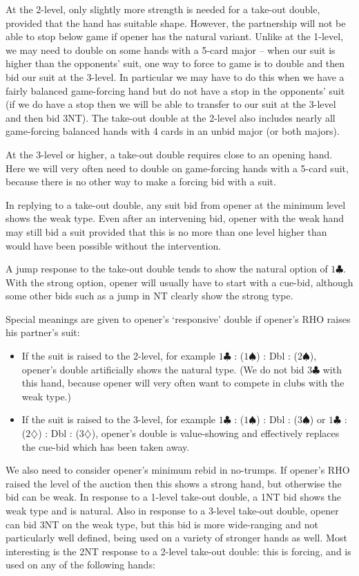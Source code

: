 \documentclass{article}
\newcommand{\sz}{\spadesuit}
\newcommand{\dz}{\diamondsuit}
\newcommand{\cz}{\clubsuit}
\begin{document}
At the 2-level, only slightly more strength is needed for a take-out double, provided that the hand has suitable shape. However, the partnership will not be able to stop below game if opener has the natural variant. Unlike at the 1-level, we may need to double on some hands with a 5-card major -- when our suit is higher than the opponents' suit, one way to force to game is to double and then bid our suit at the 3-level. In particular we may have to do this when we have a fairly balanced game-forcing hand but do not have a stop in the opponents' suit (if we do have a stop then we will be able to transfer to our suit at the 3-level and then bid 3NT). The take-out double at the 2-level also includes nearly all game-forcing balanced hands with 4 cards in an unbid major (or both majors).

At the 3-level or higher, a take-out double requires close to an opening hand. Here we will very often need to double on game-forcing hands with a 5-card suit, because there is no other way to make a forcing bid with a suit.

\vspace{4mm}
In replying to a take-out double, any suit bid from opener at the minimum level shows the weak type. Even after an intervening bid, opener with the weak hand may still bid a suit provided that this is no more than one level higher than would have been possible without the intervention.

A jump response to the take-out double tends to show the natural option of $1\cz$. With the strong option, opener will usually have to start with a cue-bid, although some other bids such as a jump in NT clearly show the strong type.

Special meanings are given to opener's `responsive' double if opener's RHO raises his partner's suit:
\begin{itemize}
\item If the suit is raised to the 2-level, for example $1\cz$ : ($1\sz$) : Dbl : ($2\sz$), opener's double artificially shows the natural type. (We do not bid $3\cz$ with this hand, because opener will very often want to compete in clubs with the weak type.)
\item If the suit is raised to the 3-level, for example $1\cz$ : ($1\sz$) : Dbl : ($3\sz$) or $1\cz$ : ($2\dz$) : Dbl : ($3\dz$), opener's double is value-showing and effectively replaces the cue-bid which has been taken away.
\end{itemize}

We also need to consider opener's minimum rebid in no-trumps. If opener's RHO raised the level of the auction then this shows a strong hand, but otherwise the bid can be weak. In response to a 1-level take-out double, a 1NT bid shows the weak type and is natural. Also in response to a 3-level take-out double, opener can bid 3NT on the weak type, but this bid is more wide-ranging and not particularly well defined, being used on a variety of stronger hands as well. Most interesting is the 2NT response to a 2-level take-out double: this is forcing, and is used on any of the following hands:
\end{document}
